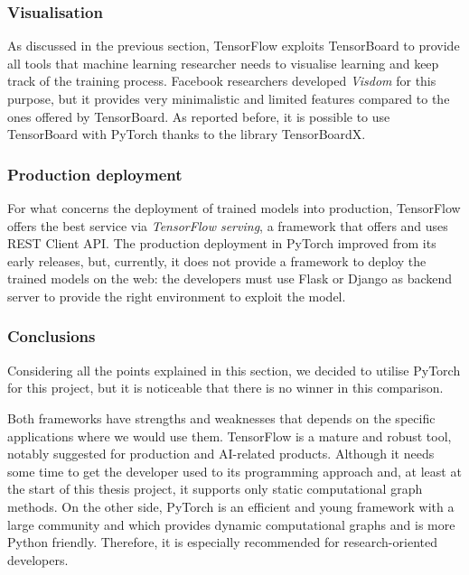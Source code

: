 \subsubsection{Visualisation}

As discussed in the previous section, TensorFlow exploits TensorBoard to provide all tools that machine learning researcher needs to visualise learning and keep track of the training process.
Facebook researchers developed \textit{Visdom} for this purpose, but it provides very minimalistic and limited features compared to the ones offered by TensorBoard.
As reported before, it is possible to use TensorBoard with PyTorch thanks to the library TensorBoardX.

\subsubsection{Production deployment}

For what concerns the deployment of trained models into production, TensorFlow offers the best service via \textit{TensorFlow serving}, a framework that offers and uses REST Client API.
The production deployment in PyTorch improved from its early releases, but, currently, it does not provide a framework to deploy the trained models on the web: the developers must use Flask or Django as backend server to provide the right environment to exploit the model.

\subsubsection{Conclusions}

Considering all the points explained in this section, we decided to utilise PyTorch for this project, but it is noticeable that there is no winner in this comparison.

Both frameworks have strengths and weaknesses that depends on the specific applications where we would use them.
TensorFlow is a mature and robust tool, notably suggested for production and AI-related products.
Although it needs some time to get the developer used to its programming approach and, at least at the start of this thesis project,  it supports only static computational graph methods.
On the other side, PyTorch is an efficient and young framework with a large community and which provides dynamic computational graphs and is more Python friendly.
Therefore, it is especially recommended for research-oriented developers.